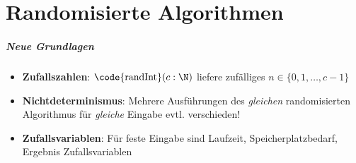 \chapter{Randomisierte Algorithmen}

\newcommand{\E}{\text{\textbf{E}}}

\paragraph{Neue Grundlagen}
\begin{itemize}
  \item \textbf{Zufallszahlen}: $ \text{\code{randInt}}(c : \N) $ liefere zufälliges $ n \in \{ 0, 1, \dots, c-1 \} $
  \item \textbf{Nichtdeterminismus}: Mehrere Ausführungen des \emph{gleichen} randomisierten Algorithmus für \emph{gleiche} Eingabe evtl. verschieden!
  \item \textbf{Zufallsvariablen}: Für feste Eingabe sind Laufzeit, Speicherplatzbedarf, Ergebnis Zufallsvariablen
\end{itemize}

